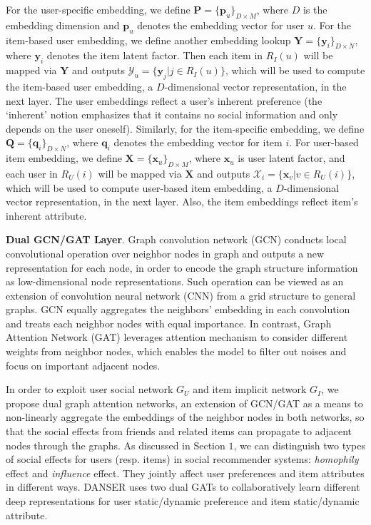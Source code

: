 \documentclass[sigconf]{acmart}
\begin{document}
For the user-specific embedding, we define $\mathbf{P}=\{\mathbf {p}_u\}_{D\times M}$, where $D$ is the embedding dimension and $\mathbf {p}_u$ denotes the embedding vector for user $u$. For the item-based user embedding, we define another embedding lookup $\mathbf {Y}=\{\mathbf {y}_i\}_{D\times N}$, where $\mathbf{y}_i$ denotes the item latent factor. Then each item in $R_I(u)$ will be mapped via $\mathbf {Y}$ and outputs $\mathcal Y_u=\{\mathbf {y}_j|j\in R_I(u)\}$, which will be used to compute the item-based user embedding, a $D$-dimensional vector representation, in the next layer. The user embeddings reflect a user's inherent preference (the `inherent' notion emphasizes that it contains no social information and only depends on the user oneself). 
Similarly, for the item-specific embedding, we define $\mathbf {Q}=\{\mathbf {q}_i\}_{D\times N}$, where $\mathbf {q}_i$ denotes the embedding vector for item $i$. For user-based item embedding, we define $\mathbf {X}=\{\mathbf {x}_u\}_{D\times M}$, where $\mathbf x_u$ is user latent factor, and each user in $R_U(i)$ will be mapped via $\mathbf {X}$ and outputs $\mathcal {X}_i=\{\mathbf {x}_v|v\in R_U(i)\}$, which will be used to compute user-based item embedding, a $D$-dimensional vector representation, in the next layer. Also, the item embeddings reflect item's inherent attribute. 

\textbf{Dual GCN/GAT Layer}. 
Graph convolution network (GCN) \cite{GCN1} conducts local convolutional operation over neighbor nodes in graph and outputs a new representation for each node, in order to encode the graph structure information as low-dimensional node representations. 
Such operation can be viewed as an extension of convolution neural network (CNN) from a grid structure to general graphs. GCN equally aggregates the neighbors' embedding in each convolution and treats each neighbor nodes with equal importance. 
In contrast, Graph Attention Network (GAT) \cite{GAT} leverages attention mechanism to consider different weights from neighbor nodes, which enables the model to filter out noises and focus on important adjacent nodes.

In order to exploit user social network $G_U$ and item implicit network $G_I$, we propose dual graph attention networks, an extension of GCN/GAT as a means to non-linearly aggregate the embeddings of the neighbor nodes in both networks, so that the social effects from friends and related items can propagate to adjacent nodes through the graphs.
As discussed in Section $1$, we can distinguish two types of social effects for users (resp. items) in social recommender systems: \emph{homophily} effect and \emph{influence} effect. 
They jointly affect user preferences and item attributes in different ways. DANSER uses two dual GATs to collaboratively learn different deep representations for user static/dynamic preference and item static/dynamic attribute. 
\end{document}
